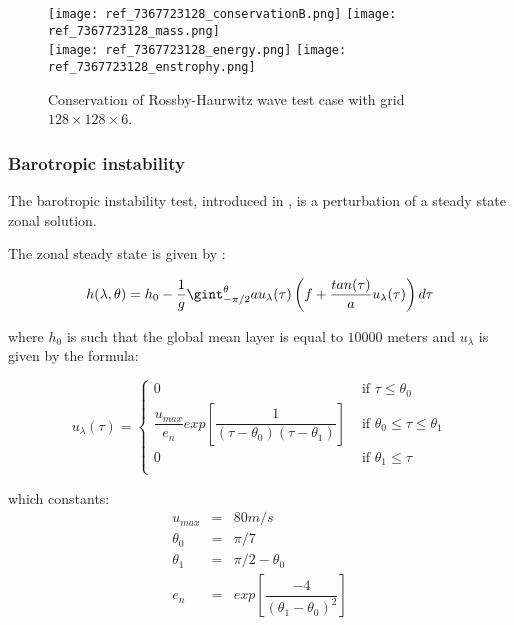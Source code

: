 \begin{figure}[ht!]
\texttt{[image: ref\_7367723128\_conservationB.png]}
\texttt{[image: ref\_7367723128\_mass.png]}\\
\texttt{[image: ref\_7367723128\_energy.png]}
\texttt{[image: ref\_7367723128\_enstrophy.png]}
\caption{Conservation of Rossby-Haurwitz wave test case with grid  $128 \times 128 \times 6$.}
\label{fig:W6 conservation}
\end{figure}

\subsubsection{Barotropic instability}

The barotropic instability test, introduced in \cite{Galewsky-Scott-Polvani}, is a perturbation of a steady state zonal solution.

The zonal steady state is given by :

\begin{equation}
h(\lambda, \theta) = h_0 - \dfrac{1}{g} \gint_{-\pi/2}^{\theta} a u_{\lambda}(\tau) \left( f + \dfrac{tan(\tau)}{a}u_{\lambda}(\tau) \right) d\tau
\label{eq:G1 steady}
\end{equation}

where $h_0$ is such that the global mean layer is equal to $10 000$ meters and $u_{\lambda}$ is given by the formula:

\begin{equation}
u_{\lambda}(\tau) = \left\lbrace
\begin{array}{ll}
0 & \text{ if } \tau \leq \theta_0 \\
\dfrac{u_{max}}{e_n} exp \left[ \dfrac{1}{(\tau - \theta_0)(\tau - \theta_1)} \right] & \text{ if } \theta_0 \leq \tau \leq \theta_1 \\
0 & \text{ if } \theta_1 \leq \tau \\
\end{array}
\right.
\end{equation}

which constants:
\begin{equation}
\begin{array}{rcl}
u_{max} & = & 80 m/s \\
\theta_0 & = & \pi /7 \\
\theta_1 & = & \pi/2 - \theta_0 \\
e_{n} & = & exp \left[ \dfrac{-4}{(\theta_1 - \theta_0)^2} \right]\\
\end{array}
\end{equation}

